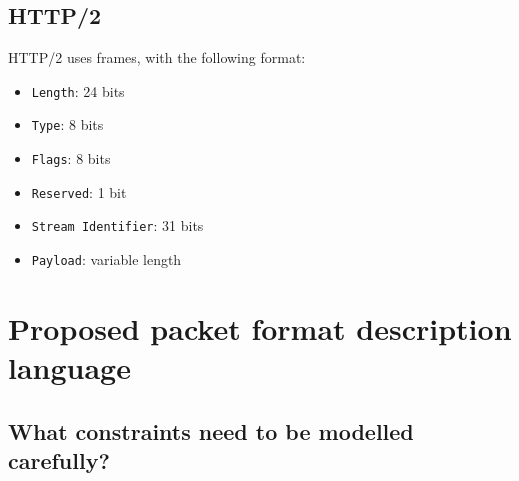 \documentclass[10pt,a4paper]{article}
\begin{document}
\subsection{HTTP/2}

HTTP/2 uses frames, with the following format:
\begin{itemize}
\item \texttt{Length}: 24 bits
\item \texttt{Type}: 8 bits
\item \texttt{Flags}: 8 bits
\item \texttt{Reserved}: 1 bit
\item \texttt{Stream Identifier}: 31 bits
\item \texttt{Payload}: variable length
\end{itemize}

\section{Proposed packet format description language}

\subsection{What constraints need to be modelled carefully?}
\end{document}
